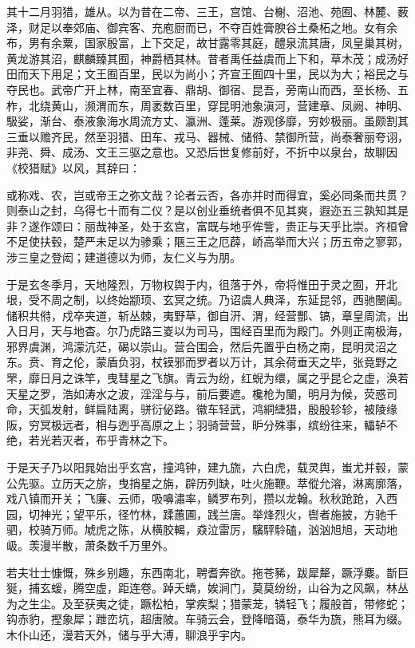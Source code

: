 \documentclass[]{article}
\begin{document}
其十二月羽猎，雄从。以为昔在二帝、三王，宫馆、台榭、沼池、苑囿、林麓、薮泽，财足以奉郊庙、御宾客、充庖厨而已，不夺百姓膏腴谷土桑柘之地。女有余布，男有余粟，国家殷富，上下交足，故甘露零其庭，醴泉流其唐，凤皇巢其树，黄龙游其沼，麒麟臻其囿，神爵栖其林。昔者禹任益虞而上下和，草木茂；成汤好田而天下用足；文王囿百里，民以为尚小；齐宣王囿四十里，民以为大；裕民之与夺民也。武帝广开上林，南至宜春、鼎胡、御宿、昆吾，旁南山而西，至长杨、五柞，北绕黄山，濒渭而东，周袤数百里，穿昆明池象滇河，营建章、凤阙、神明、馺娑，渐台、泰液象海水周流方丈、瀛洲、蓬莱。游观侈靡，穷妙极丽。虽颇割其三垂以赡齐民，然至羽猎、田车、戎马、器械、储偫、禁御所营，尚泰奢丽夸诩，非尧、舜、成汤、文王三驱之意也。又恐后世复修前好，不折中以泉台，故聊因《校猎赋》以风，其辞曰：

或称戏、农，岂或帝王之弥文哉？论者云否，各亦并时而得宜，奚必同条而共贯？则泰山之封，乌得七十而有二仪？是以创业垂统者俱不见其爽，遐迩五三孰知其是非？遂作颂曰：丽哉神圣，处于玄宫，富既与地乎侔訾，贵正与天乎比崇。齐桓曾不足使扶毂，楚严未足以为骖乘；陿三王之厄薜，峤高举而大兴；历五帝之寥郭，涉三皇之登闳；建道德以为师，友仁义与为朋。

于是玄冬季月，天地隆烈，万物权舆于内，徂落于外，帝将惟田于灵之囿，开北垠，受不周之制，以终始颛顼、玄冥之统。乃诏虞人典泽，东延昆邻，西驰闛阖。储积共偫，戍卒夹道，斩丛棘，夷野草，御自汧、渭，经营酆、镐，章皇周流，出入日月，天与地杳。尔乃虎路三嵏以为司马，围经百里而为殿门。外则正南极海，邪界虞渊，鸿濛沆茫，碣以崇山。营合围会，然后先置乎白杨之南，昆明灵沼之东。贲、育之伦，蒙盾负羽，杖镆邪而罗者以万计，其余荷垂天之毕，张竟野之罘，靡日月之诛竿，曳彗星之飞旗。青云为纷，红蜺为缳，属之乎昆仑之虚，涣若天星之罗，浩如涛水之波，淫淫与与，前后要遮。欃枪为闉，明月为候，荧惑司命，天弧发射，鲜扁陆离，骈衍佖路。徽车轻武，鸿絧緁猎，殷殷轸轸，被陵缘阪，穷冥极远者，相与迾乎高原之上；羽骑营营，昈分殊事，缤纷往来，轠轳不绝，若光若灭者，布乎青林之下。

于是天子乃以阳晁始出乎玄宫，撞鸿钟，建九旒，六白虎，载灵舆，蚩尤并毂，蒙公先驱。立历天之旂，曳捎星之旃，辟历列缺，吐火施鞭。萃傱允溶，淋离廓落，戏八镇而开关；飞廉、云师，吸嚊潚率，鳞罗布列，攒以龙翰。秋秋跄跄，入西园，切神光；望平乐，径竹林，蹂蕙圃，践兰唐。举烽烈火，辔者施披，方驰千驷，校骑万师。虓虎之陈，从横胶輵，猋泣雷厉，驞駍駖磕，汹汹旭旭，天动地岋。羡漫半散，萧条数千万里外。

若夫壮士慷慨，殊乡别趣，东西南北，聘耆奔欲。拖苍豨，跋犀犛，蹶浮麋。斮巨狿，捕玄蝯，腾空虚，距连卷。踔夭蟜，娭涧门，莫莫纷纷，山谷为之风飙，林丛为之生尘。及至获夷之徒，蹶松柏，掌疾梨；猎蒙茏，辚轻飞；履般首，带修蛇；钩赤豹，摼象犀；跇峦坑，超唐陂。车骑云会，登降暗蔼，泰华为旒，熊耳为缀。木仆山还，漫若天外，储与乎大溥，聊浪乎宇内。
\end{document}
